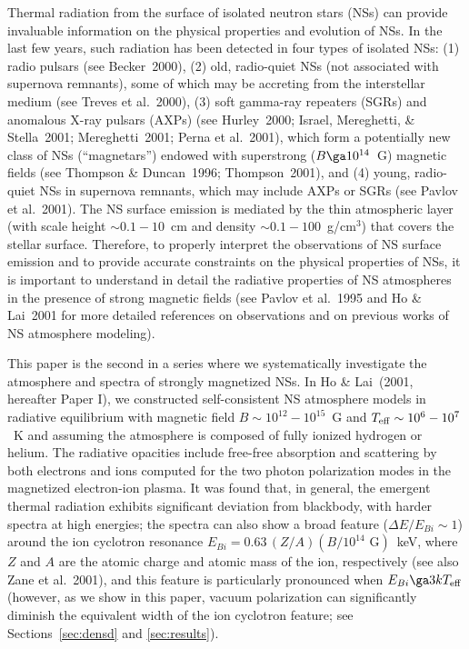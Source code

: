 \documentclass{mn2e}
\newcommand{\etal}{et al.}
\newcommand{\Teff}{T_{\rm eff}}
\newcommand{\Ebi}{E_{Bi}}
\newcommand{\holai}{Paper I}
\begin{document}
Thermal radiation from the surface of isolated neutron stars (NSs)
can provide invaluable information on the physical properties and
evolution of NSs.  In the last few years, such radiation has been
detected in four types of isolated NSs: (1) radio pulsars (see Becker~2000),
(2) old, radio-quiet NSs (not associated with supernova
remnants), some of which may be accreting from the interstellar
medium (see Treves \etal~2000),
(3) soft gamma-ray repeaters (SGRs) and anomalous X-ray pulsars (AXPs)
(see Hurley~2000; Israel, Mereghetti, \& Stella~2001; Mereghetti~2001;
Perna \etal~2001), which form a potentially new class of NSs
(``magnetars'') endowed with superstrong ($B\ga 10^{14}$~G) magnetic
fields (see Thompson \& Duncan~1996; Thompson~2001),
and (4) young, radio-quiet NSs in supernova remnants, which may
include AXPs or SGRs (see Pavlov \etal~2001).
The NS surface emission is
mediated by the thin atmospheric layer (with scale height
$\sim 0.1-10$~cm and density $\sim 0.1-100$~g/cm$^3$) that
covers the stellar surface.  Therefore, to properly interpret
the observations of NS surface emission and to provide
accurate constraints on the physical properties of NSs, it is
important to understand in detail the radiative properties
of NS atmospheres in the presence of strong magnetic fields
(see Pavlov \etal~1995 and Ho \& Lai~2001 for more detailed
references on observations and on previous works of NS
atmosphere modeling).

This paper is the second in a series where we systematically
investigate the atmosphere and spectra of strongly magnetized NSs.
In Ho \& Lai~(2001, hereafter \holai), we constructed
self-consistent NS atmosphere models in radiative equilibrium
with magnetic field $B\sim 10^{12}-10^{15}$~G and $\Teff\sim 10^6-10^7$~K
and assuming the atmosphere is composed of fully ionized hydrogen
or helium.  The radiative opacities include
free-free absorption and scattering by both electrons and ions
computed for the two photon polarization modes in the magnetized
electron-ion plasma.  It was found that, in general, the emergent
thermal radiation exhibits significant deviation from blackbody,
with harder spectra at high energies; the spectra can also show a
broad feature ($\Delta E/\Ebi\sim 1$) around the ion cyclotron
resonance $\Ebi=0.63\,(Z/A)(B/10^{14}\mbox{ G})$~keV, where $Z$ and $A$
are the atomic charge and atomic mass of the ion, respectively
(see also Zane \etal~2001), and this feature is particularly
pronounced when $\Ebi\ga 3k\Teff$
(however, as we show in this paper, vacuum polarization can significantly
diminish the equivalent width of the ion cyclotron feature;
see Sections~\ref{sec:densd} and \ref{sec:results}).
\end{document}

